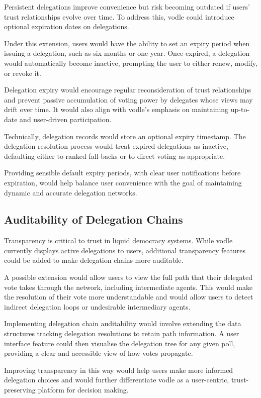 Persistent delegations improve convenience but risk becoming outdated if users' trust relationships evolve over time. To address this, vodle could introduce optional expiration dates on delegations.

Under this extension, users would have the ability to set an expiry period when issuing a delegation, such as six months or one year. Once expired, a delegation would automatically become inactive, prompting the user to either renew, modify, or revoke it.

Delegation expiry would encourage regular reconsideration of trust relationships and prevent passive accumulation of voting power by delegates whose views may drift over time. It would also align with vodle's emphasis on maintaining up-to-date and user-driven participation.

Technically, delegation records would store an optional expiry timestamp. The delegation resolution process would treat expired delegations as inactive, defaulting either to ranked fall-backs or to direct voting as appropriate.

Providing sensible default expiry periods, with clear user notifications before expiration, would help balance user convenience with the goal of maintaining dynamic and accurate delegation networks.

\subsection{Auditability of Delegation Chains}

Transparency is critical to trust in liquid democracy systems. While vodle currently displays active delegations to users, additional transparency features could be added to make delegation chains more auditable.

A possible extension would allow users to view the full path that their delegated vote takes through the network, including intermediate agents. This would make the resolution of their vote more understandable and would allow users to detect indirect delegation loops or undesirable intermediary agents.

Implementing delegation chain auditability would involve extending the data structures tracking delegation resolutions to retain path information. A user interface feature could then visualise the delegation tree for any given poll, providing a clear and accessible view of how votes propagate.

Improving transparency in this way would help users make more informed delegation choices and would further differentiate vodle as a user-centric, trust-preserving platform for decision making.


